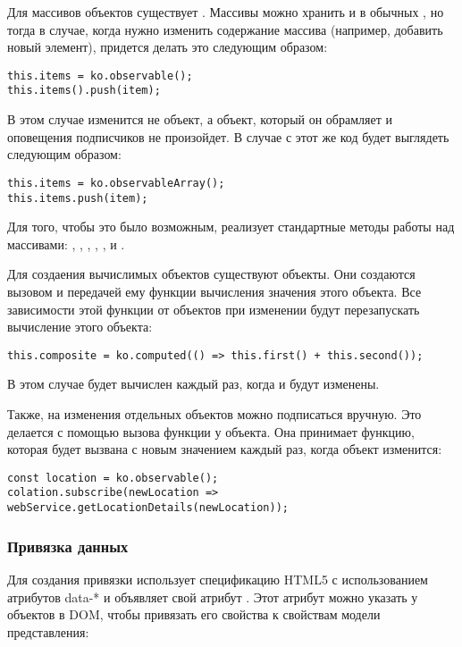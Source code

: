 \documentclass[a4paper,14pt]{extarticle}
\begin{document}
Для массивов объектов существует . Массивы можно хранить и в
обычных , но тогда в случае, когда нужно изменить содержание массива
(например, добавить новый элемент), придется делать это следующим образом:

\begin{lstlisting}
this.items = ko.observable();
this.items().push(item);
\end{lstlisting}

В этом случае изменится не  объект, а объект, который он обрамляет и
оповещения подписчиков не произойдет. В случае с  этот же код
будет выглядеть следующим образом: 

\begin{lstlisting}
this.items = ko.observableArray();
this.items.push(item);
\end{lstlisting}

Для того, чтобы это было возможным,  реализует стандартные
методы работы над массивами: , , ,
, ,  и .

Для создаения вычислимых объектов существуют  объекты. Они создаются вызовом
 и передачей ему функции вычисления значения этого объекта. Все зависимости
этой функции от объектов  при изменении будут перезапускать вычисление
этого объекта:

\begin{lstlisting}
this.composite = ko.computed(() => this.first() + this.second());
\end{lstlisting}

В этом случае  будет вычислен каждый раз, когда  и 
будут изменены.

Также, на изменения отдельных объектов можно подписаться вручную. Это делается с помощью вызова
функции  у  объекта. Она принимает функцию, которая будет вызвана
с новым значением каждый раз, когда  объект изменится:

\begin{lstlisting}
const location = ko.observable();
colation.subscribe(newLocation => webService.getLocationDetails(newLocation));
\end{lstlisting}

\subsubsection{Привязка данных}
Для создания привязки  использует спецификацию HTML5 с использованием атрибутов data-*
и объявляет свой атрибут . Этот атрибут можно указать у объектов в DOM, чтобы привязать
его свойства к свойствам модели представления:
\end{document}
